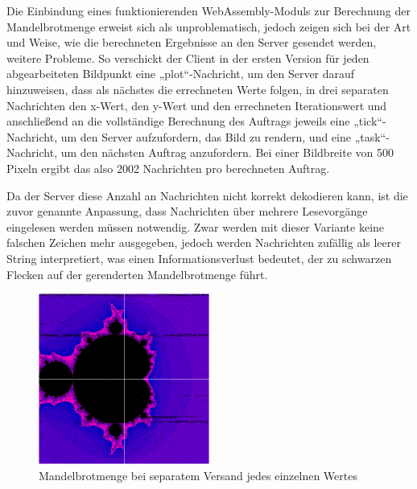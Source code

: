 \documentclass[12pt, onecolumn,notitlepage]{scrartcl}
\begin{document}
Die Einbindung eines funktionierenden WebAssembly-Moduls zur Berechnung der Mandelbrotmenge erweist sich als unproblematisch, jedoch zeigen sich bei der Art und Weise, wie die berechneten Ergebnisse an den Server gesendet werden, weitere Probleme. So verschickt der Client in der ersten Version für jeden abgearbeiteten Bildpunkt eine „plot“-Nachricht, um den Server darauf hinzuweisen, dass als nächstes die errechneten Werte folgen, in drei separaten Nachrichten den x-Wert, den y-Wert und den errechneten Iterationswert und anschließend an die vollständige Berechnung des Auftrags jeweils eine „tick“-Nachricht, um den Server aufzufordern, das Bild zu rendern, und eine „task“-Nachricht, um den nächsten Auftrag anzufordern. Bei einer Bildbreite von 500 Pixeln ergibt das also 2002 Nachrichten pro berechneten Auftrag. \par

Da der Server diese Anzahl an Nachrichten nicht korrekt dekodieren kann, ist die zuvor genannte Anpassung, dass Nachrichten über mehrere Lesevorgänge eingelesen werden müssen notwendig. Zwar werden mit dieser Variante keine falschen Zeichen mehr ausgegeben, jedoch werden Nachrichten zufällig als leerer String interpretiert, was einen Informationsverlust bedeutet, der zu schwarzen Flecken auf der gerenderten Mandelbrotmenge führt. \par

\begin{figure}[htbp] 
	\centering
	\includegraphics[width=0.5\textwidth]{einzelnVersandt.PNG}
	\caption{Mandelbrotmenge bei separatem Versand jedes einzelnen Wertes}
	\label{fig:Bild1}
\end{figure}
\end{document}
